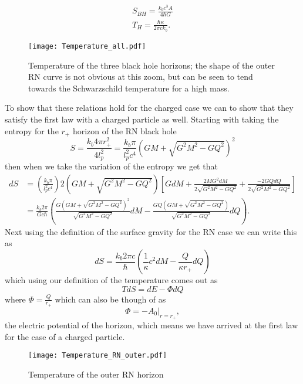 \documentclass[12pt]{article}
\numberwithin{equation}{section}
\numberwithin{figure}{section}
\begin{document}
\begin{align}
	S_{BH}=\frac{k_{b}c^{3}A}{4\hbar G}  \label{eq:entropy}\\
	T_{H}= \frac{\hbar\kappa}{2\pi ck_{b}}.
\end{align}
\begin{figure}
	\centering
        \texttt{[image: Temperature\_all.pdf]}
	\caption{Temperature of the three black hole horizons; the shape of the outer RN curve is not obvious at this zoom, but can be seen to tend towards the Schwarzschild temperature for a high mass.}
	\label{fig:temp_all}
\end{figure}
To show that these relations hold for the charged case we can to show that they satisfy the first law with a charged particle as well. Starting with taking the entropy for the $r_{+}$ horizon of the RN black hole
\begin{equation}
	S= \frac{k_{b}4\pi r_{+}^{2}}{4 l_{p}^{2}}=\frac{k_{b}\pi}{l_{p}^{2}c^{4}}\left(GM+\sqrt{G^{2}M^{2}-GQ^{2}}\right)^{2}
\end{equation}
then when we take the variation of the entropy we get that
\begin{align}
	dS&=\left(\frac{k_{b}\pi}{l_{p}^{2}c^{4}}\right)2\left(GM+\sqrt{G^{2}M^{2}-GQ^{2}}\right)\left[GdM+\frac{2MG^{2}dM}{2\sqrt{G^{2}M^{2}-GQ^{2}}}+\frac{-2GQdQ}{2\sqrt{G^{2}M^{2}-GQ^{2}}}\right]\\
	&=\frac{k_{b}2\pi}{Gc\hbar}\left(\frac{G(GM+\sqrt{G^{2}M^{2}-GQ^{2}})^2}{\sqrt{G^{2}M^{2}-GQ^{2}}}dM - \frac{GQ(GM+\sqrt{G^{2}M^{2}-GQ^{2}})}{\sqrt{G^{2}M^{2}-GQ^{2}}}dQ\right).
\end{align}
Next using the definition of the surface gravity for the RN case we can write this as
\begin{equation}
	dS=\frac{k_{b}2\pi c}{\hbar}\left(\frac{1}{\kappa}c^{2}dM- \frac{Q}{\kappa r_{+}}dQ\right)
\end{equation}
which using our definition of the temperature comes out as
\begin{equation}
	TdS=dE-\Phi dQ
\end{equation}
where $\Phi=\frac{Q}{r_{+}}$ which can also be though of as 
\begin{equation}
	\Phi=\left. -A_{0}\right|_{r=r_{+}},
\end{equation}
the electric potential of the horizon, which means we have arrived at the first law for the case of a charged particle. 
\begin{figure}
	\centering
        \texttt{[image: Temperature\_RN\_outer.pdf]}
	\caption{Temperature of the outer RN horizon}
	\label{fig:temp_outer_RN}
\end{figure}
\end{document}
